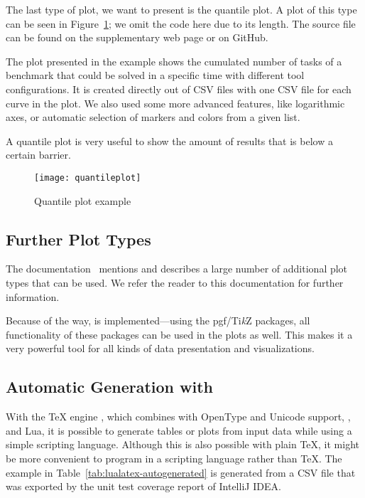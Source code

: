 The last type of plot, we want to present is the quantile plot.  A plot of this
type can be seen in Figure~\ref{fig:quantileplot}; we omit the code here due to
its length.  The source file can be found on the supplementary web page or on
GitHub.

The plot presented in the example shows the cumulated number of tasks of a
benchmark that could be solved in a specific time with different tool
configurations.  It is created directly out of CSV files with one CSV file for
each curve in the plot.  We also used some more advanced features, like
logarithmic axes, or automatic selection of markers and colors from a given
list.

A quantile plot is very useful to show the amount of results that is below a
certain barrier.

\begin{figure}[!t]
  \centering
  \texttt{[image: quantileplot]}
  \caption{Quantile plot example}
  \label{fig:quantileplot}
\end{figure}

\subsection{Further Plot Types}

The  documentation~\cite{Feuersaenger2016} mentions and
describes a large number of additional plot types that can be used.  We refer
the reader to this documentation for further information.

Because of the way,  is implemented—using the
\textsf{pgf/Ti\emph{k}Z} packages, all functionality of these packages can be
used in the plots as well.  This makes it a very powerful tool for all kinds of
data presentation and visualizations.

\subsection{Automatic Generation with }

With the \TeX{} engine , which combines  with
OpenType and Unicode support, , and Lua, it is possible to
generate tables or plots from input data while using a simple scripting
language.  Although this is also possible with plain \TeX{}, it might be more
convenient to program in a scripting language rather than \TeX{}.  The example
in Table~\ref{tab:lualatex-autogenerated} is generated from a CSV file that was
exported by the unit test coverage report of IntelliJ IDEA.

